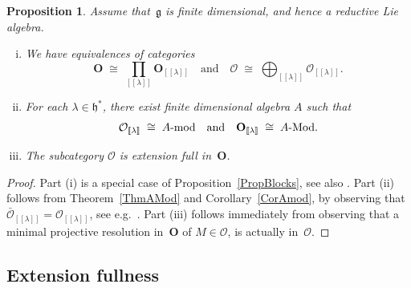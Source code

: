 \documentclass[11pt]{amsart}
\newcommand{\lbra}{[\![}
\newcommand{\rbra}{]\!]}
\newcommand{\cO}{\mathcal O}
\newcommand{\bO}{\mathbf{O}}
\newcommand{\fg}{\mathfrak{g}}
\newcommand{\fh}{\mathfrak{h}}
\numberwithin{equation}{section}
\theoremstyle{plain}
\newtheorem{prop}[subsubsection]{Proposition}
\theoremstyle{remark}
\theoremstyle{remark}
\theoremstyle{construction}
\begin{document}
\begin{prop}\label{FDprop}
Assume that~$\fg$ is finite dimensional, and hence a reductive Lie algebra. 
\begin{enumerate}[(i)]
\item We have equivalences of categories
$$\bO\;\cong\; \prod_{\lbra\lambda\rbra} \bO_{\lbra\lambda\rbra}\quad\mbox{and}\quad \cO\;\cong\;\bigoplus_{\lbra\lambda\rbra} \cO_{\lbra\lambda\rbra}. $$
\item For each $\lambda\in\fh^\ast$, there exist finite dimensional algebra $A$ such that
$$\cO_{\lbra\lambda\rbra}\;\cong\; A\mbox{{\rm -mod}}\quad\mbox{and}\quad \bO_{\lbra\lambda\rbra}\;\cong\; A\mbox{{\rm -Mod}}.$$
\item The subcategory $\cO$ is extension full in~$\bO$.
\end{enumerate}
\end{prop}
\begin{proof}
Part (i) is a special case of Proposition~\ref{PropBlocks}, see also \cite{BGG}. Part (ii) follows from Theorem~\ref{ThmAMod} and Corollary~\ref{CorAmod}, by observing that~$\bar{\cO}_{\lbra\lambda\rbra}=\cO_{\lbra\lambda\rbra}$, see e.g.~\cite[Section~5.1]{NamT}.
Part (iii) follows immediately from observing that a minimal projective resolution in~$\bO$ of $M\in\cO$, is actually in~$\cO$.
\end{proof}



\subsection{Extension fullness}
\end{document}
